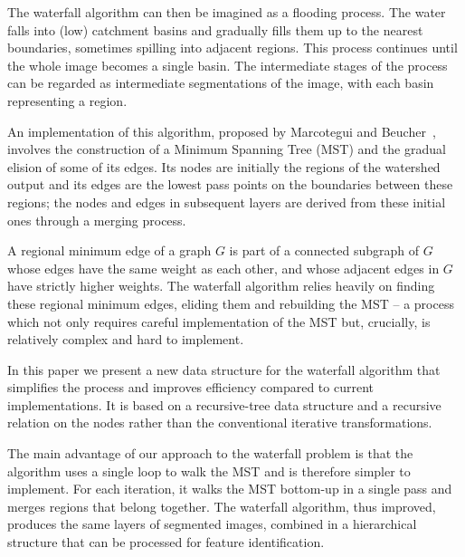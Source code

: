 \documentclass{article}
\begin{document}
The waterfall algorithm can then be imagined
as a flooding process. The water falls into (low) catchment basins and
gradually fills them up to the nearest boundaries, sometimes spilling
into adjacent regions. This process continues until the whole image
becomes a single basin. The intermediate stages of the process can be
regarded as intermediate segmentations of the image, with each basin
representing a region.

An implementation of this algorithm, proposed by Marcotegui and
Beucher~\cite{marcotegui}, involves the construction of a Minimum
Spanning Tree (MST) and the gradual elision of some of its edges.  Its
nodes are initially the regions of the watershed output and its edges
are the lowest pass points on the boundaries between these regions;
the nodes and edges in subsequent layers are derived from these
initial ones through a merging process.

A regional minimum edge of a graph $G$ is part of a connected subgraph
of $G$ whose edges have the same weight as each other, and whose
adjacent edges in $G$ have strictly higher weights. The waterfall
algorithm relies heavily on finding these regional minimum edges,
eliding them and rebuilding the MST -- a process which not only
requires careful implementation of the MST but, crucially, is
relatively complex and hard to implement.

\iffalse
The collection of regional minimum edges of a graph $G$ is a connected
subgraph of $G$ whose edges have the same weight as each other, and
whose adjacent edges in $G$ have strictly higher weights. The
waterfall algorithm relies heavily on finding these regional minimum
edges, eliding them and rebuilding the MST -- a process which not only
requires careful implementation of the MST but, more importantly, is
relatively complex and hard to implement.
\fi

In this paper we present a new data structure for the waterfall
algorithm that simplifies the process and improves efficiency compared
to current implementations. It is based on a recursive-tree data
structure and a recursive relation on the nodes rather than the
conventional iterative transformations.

The main advantage of our approach to the waterfall problem is that
the algorithm uses a single loop to walk the MST and is therefore
simpler to implement. For each iteration, it walks the MST bottom-up
in a single pass and merges regions that belong together. The
waterfall algorithm, thus improved, produces the same layers of
segmented images, combined in a hierarchical structure that can be
processed for feature identification.
\end{document}
